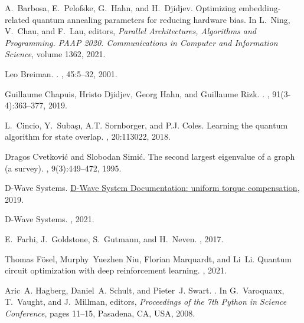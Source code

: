 \documentclass[a4paper,11pt]{article}
\begin{document}
% 
% 
\begin{thebibliography}{10}
A.~Barbosa, E.~Pelofske, G.~Hahn, and H.~Djidjev.
\newblock Optimizing embedding-related quantum annealing parameters for
  reducing hardware bias.
\newblock In L.~Ning, V.~Chau, and F.~Lau, editors, {\em Parallel
  Architectures, Algorithms and Programming. PAAP 2020. Communications in
  Computer and Information Science}, volume 1362, 2021.

Leo Breiman.
.
, 45:5--32, 2001.

Guillaume Chapuis, Hristo Djidjev, Georg Hahn, and Guillaume Rizk.
.
, 91(3-4):363--377, 2019.

L.~Cincio, Y.~Suba{\c s}{\i}, A.T. Sornborger, and P.J. Coles.
\newblock Learning the quantum algorithm for state overlap.
, 20:113022, 2018.

Dragos Cvetkovi{\'c} and Slobodan Simi{\'c}.
\newblock The second largest eigenvalue of a graph (a survey).
, 9(3):449--472, 1995.

{D-Wave Systems}.
\newblock
  \href{https://docs.ocean.dwavesys.com/projects/system/en/stable/reference/generated/dwave.embedding.chain_strength.uniform_torque_compensation.html}{D-Wave
  System Documentation: uniform torque compensation}, 2019.

{D-Wave Systems}.
, 2021.

E.~Farhi, J.~Goldstone, S.~Gutmann, and H.~Neven.
, 2017.

Thomas F{\" o}sel, Murphy~Yuezhen Niu, Florian Marquardt, and Li~Li.
\newblock Quantum circuit optimization with deep reinforcement learning.
, 2021.

Aric~A. Hagberg, Daniel~A. Schult, and Pieter~J. Swart.
.
\newblock In G.~Varoquaux, T.~Vaught, and J.~Millman, editors, {\em Proceedings
  of the 7th Python in Science Conference}, pages 11--15, Pasadena, CA, USA,
  2008.


\end{thebibliography}
\end{document}
